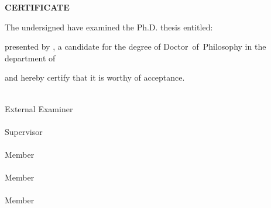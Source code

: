 
\begin{center}\Large{\textbf{CERTIFICATE}}\end{center}
\vspace{0.5cm}
The undersigned have examined the Ph.D. thesis entitled:
\begin{center}\textbf{\thesistitle}\end{center}
presented by \salutation \studentname, a candidate for the degree of \mbox{Doctor of Philosophy} in the department of \subject, and hereby certify that it is worthy of acceptance.

\vspace{1cm}
\parbox{0.6\textwidth}{ 
\vspace{16cm}
}
\hfill 
\parbox{0.4\textwidth}{ 
\mbox{\external}\\
External Examiner\\

\vspace{1.3cm}
\mbox{\advisorname}\\
Supervisor\\

\vspace{1.3cm}
\mbox{\memberone}\\
Member\\

\vspace{1.3cm}
\mbox{\membertwo}\\
Member\\

\vspace{1.3cm}
\mbox{\memberthre}\\
Member\\
}
